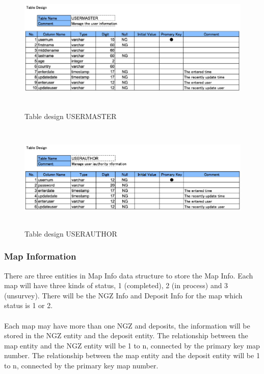 \documentclass[11pt, a4paper]{article}
\begin{document}
\begin{figure}[H]
\centering
\includegraphics[height=2.5in]{USM}
\caption[Table design USERMASTER]{Table design USERMASTER}
\end{figure}

\begin{figure}[H]
\centering
\includegraphics[height=2in]{USA}
\caption[Table design USERAUTHOR]{Table design USERAUTHOR}
\end{figure}

\subsubsection{Map Information}
There are three entities in Map Info data structure to store the Map Info. Each map will have three kinds of status, 1 (completed), 2 (in process) and 3 (unsurvey). There will be the NGZ Info and Deposit Info for the map which status is 1 or 2.\\
\\
Each map may have more than one NGZ and deposits, the information will be stored in the NGZ entity and the deposit entity. The relationship between the map entity and the NGZ entity will be 1 to n, connected by the primary key map number. The relationship between the map entity and the deposit entity will be 1 to n, connected by the primary key map number. 
\end{document}

